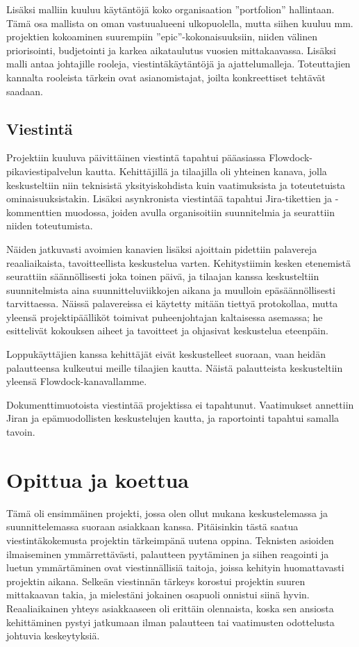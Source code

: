 \documentclass{article}
\begin{document}
Lisäksi malliin kuuluu käytäntöjä koko organisaation ''portfolion'' hallintaan.
Tämä osa mallista on oman vastuualueeni ulkopuolella, mutta siihen kuuluu mm.
projektien kokoaminen suurempiin ''epic''-kokonaisuuksiin, niiden välinen
priorisointi, budjetointi ja karkea aikataulutus vuosien mittakaavassa. Lisäksi
malli antaa johtajille rooleja, vies\-tintäkäytäntöjä ja ajattelumalleja.
Toteuttajien kannalta rooleista tärkein ovat asianomistajat, joilta
konkreettiset tehtävät saadaan.

\subsection{Viestintä}

Projektiin kuuluva päivittäinen viestintä tapahtui pääasiassa
Flowdock-pikaviestipalvelun kautta. Kehittäjillä ja tilaajilla oli yhteinen
kanava, jolla keskusteltiin niin teknisistä yksityiskohdista kuin vaatimuksista
ja toteutetuista ominaisuuksistakin. Lisäksi asynkronista viestintää tapahtui
Jira-tikettien ja -kommenttien muodossa, joiden avulla organisoitiin
suunnitelmia ja seurattiin niiden toteutumista.

Näiden jatkuvasti avoimien kanavien lisäksi ajoittain pidettiin palavereja
reaaliaikaista, tavoitteellista keskustelua varten. Kehitystiimin kesken
etenemistä seurattiin säännöllisesti joka toinen päivä, ja tilaajan kanssa
keskusteltiin suunnitelmista aina suunnitteluviikkojen aikana ja muulloin
epäsäännöllisesti tarvittaessa. Näissä palavereissa ei käytetty mitään tiettyä
protokollaa, mutta yleensä projektipäälliköt toimivat puheenjohtajan
kaltaisessa asemassa; he esittelivät kokouksen aiheet ja tavoitteet ja
ohjasivat keskustelua eteenpäin.

Loppukäyttäjien kanssa kehittäjät eivät keskustelleet suoraan, vaan heidän
palautteensa kulkeutui meille tilaajien kautta. Näistä palautteista
keskusteltiin yleensä Flowdock-kanavallamme.

Dokumenttimuotoista viestintää projektissa ei tapahtunut. Vaatimukset annettiin
Jiran ja epämuodollisten keskustelujen kautta, ja raportointi tapahtui samalla
tavoin.

\section{Opittua ja koettua}

Tämä oli ensimmäinen projekti, jossa olen ollut mukana keskustelemassa ja
suunnittelemassa suoraan asiakkaan kanssa. Pitäisinkin tästä saatua
viestintäkokemusta projektin tärkeimpänä uutena oppina. Teknisten asioiden
ilmaiseminen ymmärrettävästi, palautteen pyytäminen ja siihen reagointi ja
luetun ymmärtäminen ovat viestinnällisiä taitoja, joissa kehityin huomattavasti
projektin aikana. Selkeän viestinnän tärkeys korostui projektin suuren
mittakaavan takia, ja mieles\-tä\-ni jokainen osapuoli onnistui siinä hyvin.
Reaaliaikainen yhteys asiakkaaseen oli erittäin olennaista, koska sen ansiosta
kehittäminen pystyi jatkumaan ilman palautteen tai vaatimusten odottelusta
johtuvia keskeytyksiä.
\end{document}
